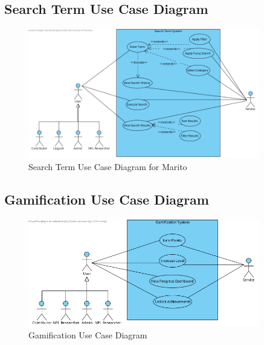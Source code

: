 \documentclass[12pt]{article}
\begin{document}
\subsection{Search Term Use Case Diagram}
\begin{figure}[H]
  \centering
  \includegraphics[width=0.9\textwidth]{SearchTermUseCase.png}
  \caption{Search Term Use Case Diagram for Marito}
  \label{fig:search-use-case}
\end{figure}

\subsection{Gamification Use Case Diagram}
\begin{figure}[H]
  \centering
  \includegraphics[width=0.9\textwidth]{GamifictionUseCase.png}
  \caption{Gamification Use Case Diagram}
  \label{fig:gamification-use-case}
\end{figure}
\end{document}
